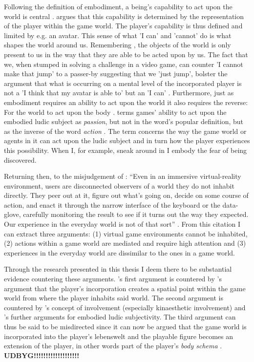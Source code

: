 Following the definition of embodiment, a being's capability to act upon the world is central \cite{ponty}.  argues that this capability is determined by the representation of the player within the game world. The player's capability is thus defined and limited by e.g. an avatar. This sense of what 'I can' and 'cannot' do is what shapes the world around us. Remembering , the objects of the world is only present to us in the way that they are able to be acted upon by us. The fact that we, when stumped in solving a challenge in a video game, can counter 'I cannot make that jump' to a passer-by suggesting that we 'just jump', bolster the argument that what is occurring on a mental level of the incorporated player is not a 'I think that my avatar is able to' but an 'I can' \cite{vellashort}. Furthermore, just as embodiment requires an ability to act upon the world it also requires the reverse: For the world to act upon the body \cite{ponty}.  terms games' ability to act upon the embodied ludic subject as \textit{passion}, but not in the word's popular definition, but as the inverse of the word \textit{action} \cite{vella}. The term concerns the way the game world or agents in it can act upon the ludic subject and in turn how the player experiences this possibility. When I, for example, sneak around in  I embody the fear of being discovered.

Returning then, to the misjudgement of : ``Even in an immersive virtual-reality environment, users are disconnected observers of a world they do not inhabit directly. They peer out at it, figure out what’s going on, decide on some course of action, and enact it through the narrow interface of the keyboard or the data-glove, carefully monitoring the result to see if it turns out the way they expected. Our experience in the everyday world is not of that sort'' \cite[p. 102]{dourish}. From this citation I can extract three arguments: (1) virtual game environments cannot be inhabited, (2) actions within a game world are mediated and require high attention and (3) experiences in the everyday world are dissimilar to the ones in a game world.

Through the research presented in this thesis I deem there to be substantial evidence countering these arguments. \citeauthor{dourish}'s \citeyear{dourish} first argument is countered by \citeauthor{vella}'s argument that the player's incorporation \cite{calleja} creates a spatial point within the game world from where the player inhabits said world. The second argument is countered by \citeauthor{calleja}'s \citeyear{calleja} concept of involvement (especially kinaesthetic involvement) and \citeauthor{vella}'s \citeyear{vella} further arguments for embodied ludic subjectivity. The third argument can thus be said to be misdirected since it can now be argued that the game world is incorporated into the player's lebenswelt and the playable figure becomes an extension of the player, in other words part of the player's \textit{body schema} \cite{vellashort} \cite{haans}. \textbf{UDBYG!!!!!!!!!!!!!!!!!!!}
